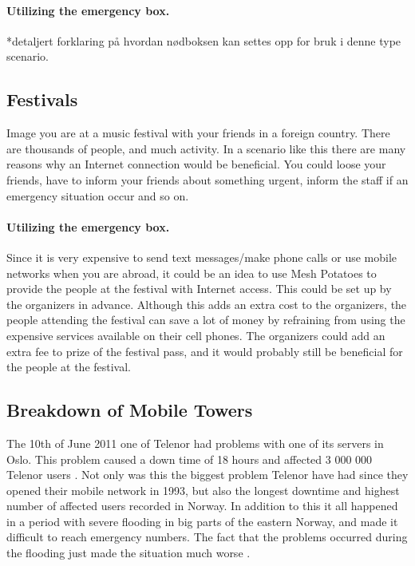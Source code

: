 \paragraph{Utilizing the emergency box.}
*detaljert forklaring på hvordan nødboksen kan settes opp for bruk i denne type scenario. 

\subsection{Festivals}
Image you are at a music festival with your friends in a foreign country. There are thousands of people, and much activity. In a scenario like this there are many reasons why an Internet connection would be beneficial. You could loose your friends, have to inform your friends about something urgent, inform the staff if an emergency situation occur and so on. 

\paragraph{Utilizing the emergency box.}
Since it is very expensive to send text messages/make phone calls or use mobile networks when you are abroad, it could be an idea to use Mesh Potatoes to provide the people at the festival with Internet access. This could be set up by the organizers in advance. Although this adds an extra cost to the organizers, the people attending the festival can save a lot of money by refraining from using the expensive services available on their cell phones. The organizers could add an extra fee to prize of the festival pass, and it would probably still be beneficial for the people at the festival. 

\subsection{Breakdown of Mobile Towers}

The 10th of June 2011 one of Telenor had problems with one of its servers in Oslo. This problem caused a down time of 18 hours and affected 3 000 000 Telenor users \cite{listeNedetid}. Not only was this the biggest problem Telenor have had since they opened their mobile network in 1993, but also the longest downtime and highest number of affected users recorded in Norway. In addition to this it all happened in a period with severe flooding in big parts of the eastern Norway, and made it difficult to reach emergency numbers. The fact that the problems occurred during the flooding just made the situation much worse \cite{TelenorNede}.

